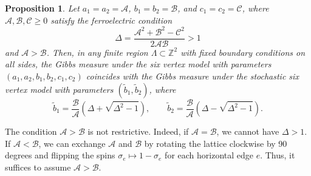 \documentclass[letterpaper,11pt,oneside,reqno]{article}
\numberwithin{equation}{section}
\newtheorem{proposition}{Proposition}[section]
\theoremstyle{definition}
\theoremstyle{remark}
\begin{document}
\begin{proposition}
	\label{prop:Aggarwal_lemma_Gibbs_property}
	Let $a_1=a_2=\mathscr{A}$, $b_1=b_2=\mathscr{B}$, and $c_1=c_2=\mathscr{C}$, where
	$\mathscr{A},\mathscr{B},\mathscr{C}\ge0$ satisfy the ferroelectric condition
	\begin{equation*}
		\Delta=\frac{\mathscr{A}^2+\mathscr{B}^2-\mathscr{C}^2}{2\mathscr{A}\mathscr{B}}>1
	\end{equation*}
	and $\mathscr{A}>\mathscr{B}$.
	Then, in any finite region $\Lambda\subset\mathbb{Z}^{2}$ with fixed boundary 
	conditions on all sides, the Gibbs measure under the six vertex model
	with parameters $(a_1,a_2,b_1,b_2,c_1,c_2)$
	coincides with the Gibbs measure
	under the \emph{stochastic} six vertex model with parameters $(\tilde b_1,\tilde b_2)$,
	where 
	\begin{equation}
		\label{eq:Aggarwal_lemma_Gibbs_property_formulation}
		\tilde b_1=\frac{\mathscr{B}}{\mathscr{A}}\left( \Delta+\sqrt{\Delta^2-1} \right)
		,\qquad 
		\tilde b_2=\frac{\mathscr{B}}{\mathscr{A}}\left( \Delta-\sqrt{\Delta^2-1} \right).
	\end{equation}
\end{proposition}
The condition $\mathscr{A}>\mathscr{B}$ is not restrictive. Indeed, 
if $\mathscr{A}=\mathscr{B}$, we cannot have $\Delta>1$. 
If $\mathscr{A}<\mathscr{B}$, we can 
exchange $\mathscr{A}$ and $\mathscr{B}$ by
rotating the lattice clockwise by 90 degrees
and flipping the spins $\sigma_e\mapsto 1-\sigma_e$ for each horizontal edge $e$.
Thus, it suffices to assume $\mathscr{A}>\mathscr{B}$.
\end{document}
